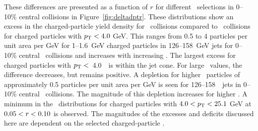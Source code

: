 These differences are presented as a function of $r$ for different \pt\ selections in 0--10\% central collisions in Figure~\ref{fig:deltadptr}.
These distributions show an excess in the charged-particle yield density for \pbpb\ collisions compared to \pp\ collisions for charged particles with $\mbox{$p_{\mathrm{T}}$} <4.0$ GeV.
This ranges from 0.5 to 4 particles per unit area per GeV for \mbox{1--1.6 GeV} charged particles in \mbox{126--158 GeV} jets for 0--10\% central \pbpb\ collisions and increases with increasing \ptjet.
The largest excess for charged particles with $\mbox{$p_{\mathrm{T}}$} <$~4.0~\GeV\ is within the jet cone.
For large \rvar\ values, the difference decreases, but remains positive.
A depletion for higher \pt\ particles of approximately 0.5 particles per unit area per GeV is seen for 126--158~\GeV\ jets in 0--10\% central \pbpb\ collisions.
The magnitude of this depletion increases for higher \ptjet.
A minimum in the \DeltaDptr\ distributions for charged particles with \mbox{$ 4.0 < \mbox{$p_{\mathrm{T}}$} <  25.1$} GeV at $0.05 < \mbox{$r$} < 0.10$ is observed.
The magnitudes of the excesses and deficits discussed here are dependent on the selected charged-particle \pt.

